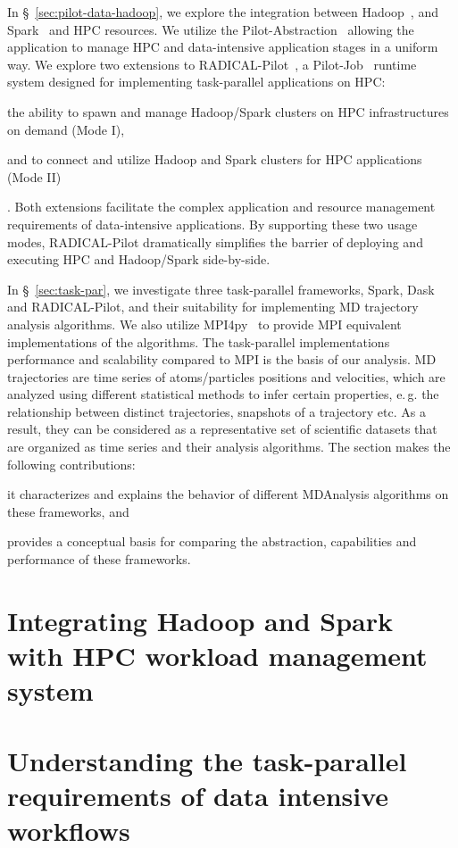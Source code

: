 In \S~\ref{sec:pilot-data-hadoop}, we explore the integration between Hadoop~\cite{hadoop}, and Spark~\cite{zaharia2010spark} and HPC resources.
We utilize the Pilot-Abstraction~\cite{luckow2012pstar} allowing the application to manage HPC and data-intensive application stages in a uniform way.
We explore two extensions to RADICAL-Pilot~\cite{merzky2018design}, a Pilot-Job~\cite{luckow2012pstar} runtime system designed for implementing task-parallel applications on HPC: 
\begin{inparaenum}[(i)]
    \item the ability to spawn and manage Hadoop/Spark clusters on HPC infrastructures on demand (Mode I),
    \item and to connect and utilize Hadoop and Spark clusters for HPC applications (Mode II)
\end{inparaenum}.
Both extensions facilitate the complex application and resource management requirements of data-intensive applications.
By supporting these two usage modes, RADICAL-Pilot dramatically simplifies the barrier of deploying and executing HPC and Hadoop/Spark side-by-side.

In \S~\ref{sec:task-par}, we investigate three task-parallel frameworks, Spark, Dask and RADICAL-Pilot, and their suitability for implementing MD trajectory analysis algorithms.
We also utilize MPI4py~\cite{dalcin2005mpi} to provide MPI equivalent implementations of the algorithms.
The task-parallel implementations performance and scalability compared to MPI is the basis of our analysis.
MD trajectories are time series of atoms/particles positions and velocities, which are analyzed using different statistical methods to infer certain properties, e.\,g. the relationship between distinct trajectories, snapshots of a trajectory etc.
As a result, they can be considered as a representative set of scientific datasets that are organized as time series and their analysis algorithms. 
The section makes the following contributions: 
\begin{inparaenum}[i)]
    \item it characterizes and explains the behavior of different MDAnalysis algorithms on these frameworks, and
    \item provides a conceptual basis for comparing the abstraction, capabilities and performance of these frameworks.
\end{inparaenum}


\section{Integrating Hadoop and Spark with HPC workload management system}



\section{Understanding the task-parallel requirements of data intensive workflows}
